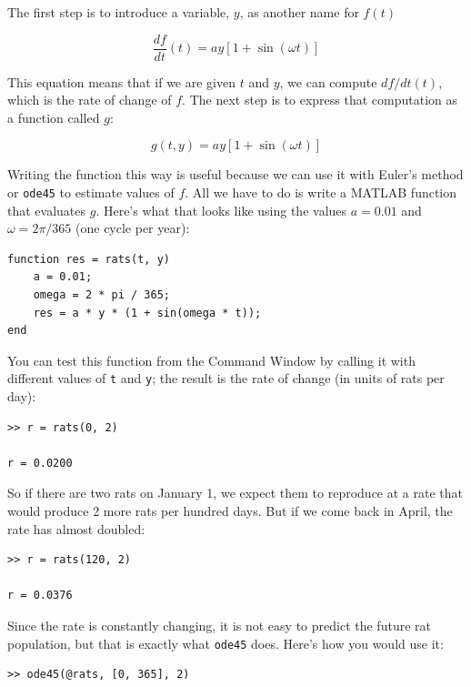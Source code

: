 \documentclass[
]{book}
\begin{document}
The first step is to introduce a variable,
$y$, as another name for $f(t)$

\begin{equation}
\frac{df}{dt}(t) = a y \left[1 + \sin (\omega t) \right]
\end{equation}

This equation means that if we are given $t$ and $y$, we can
compute $df/dt(t)$, which is the rate of change of $f$.
The next step is to express that computation as a function called
$g$:

\begin{equation}
g(t, y) = a y \left[1 + \sin (\omega t) \right]
\end{equation}

Writing the function this way is useful because we can use it
with Euler's method
or {\tt ode45} to estimate values of $f$.  All we have to
do is write a MATLAB function that evaluates $g$.  Here's what
that looks like using the values $a = 0.01$
and $\omega = 2 \pi/365$ (one cycle per year):

\begin{verbatim}
function res = rats(t, y)
    a = 0.01;
    omega = 2 * pi / 365;
    res = a * y * (1 + sin(omega * t));
end
\end{verbatim}

You can test this function from the Command Window by calling it with
different values of {\tt t} and {\tt y}; the result is the rate of
change (in units of rats per day):

\begin{verbatim}
>> r = rats(0, 2)

r = 0.0200
\end{verbatim}

So if there are two rats on January 1, we expect them to reproduce
at a rate that would produce 2 more rats per hundred days. But
if we come back in April, the rate has almost doubled:

\begin{verbatim}
>> r = rats(120, 2)

r = 0.0376
\end{verbatim}

Since the rate is constantly changing, it is not easy to predict
the future rat population, but that is exactly what {\tt ode45} does.
Here's how you would use it:

\begin{verbatim}
>> ode45(@rats, [0, 365], 2)
\end{verbatim}
\end{document}
